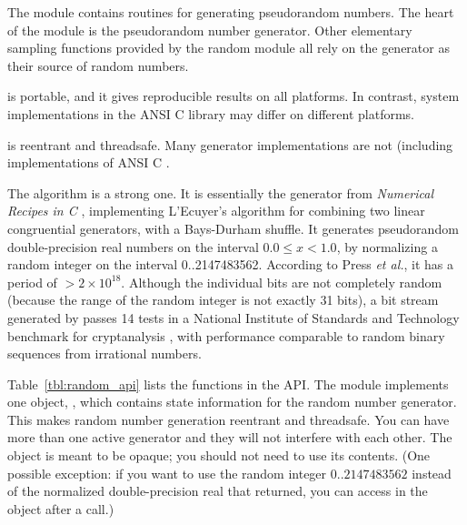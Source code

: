 The  module contains routines for generating
pseudorandom numbers. The heart of the module is the
 pseudorandom number generator. Other elementary
sampling functions provided by the random module all rely on the
 generator as their source of random numbers.

 is portable, and it gives reproducible results
on all platforms. In contrast, system  implementations
in the ANSI C library may differ on different platforms.

 is reentrant and threadsafe. Many generator
implementations are not (including implementations of ANSI C
.

The  algorithm is a strong one. It is essentially
the  generator from \emph{Numerical Recipes in C}
\citep{Press93}, implementing L'Ecuyer's algorithm for combining two
linear congruential generators, with a Bays-Durham shuffle. It
generates pseudorandom double-precision real numbers on the interval
$0.0 \leq x < 1.0$, by normalizing a random integer on the interval
0..2147483562.  According to Press \emph{et al.}, it has a period of
$> 2 \times 10^{18}$. Although the individual bits are not completely
random (because the range of the random integer is not exactly 31
bits), a bit stream generated by  passes 14 tests
in a National Institute of Standards and Technology benchmark for
cryptanalysis \citep{Rukhin01}, with performance comparable to random
binary sequences from irrational numbers.

Table~\ref{tbl:random_api} lists the functions in the 
API. The module implements one object, , which
contains state information for the random number generator.  This
makes random number generation reentrant and threadsafe. You can have
more than one active generator and they will not interfere with each
other. The object is meant to be opaque; you should not need to use
its contents.  (One possible exception: if you want to use the random
integer $0..2147483562$ instead of the normalized double-precision
real that  returned, you can access
 in the  object after a
 call.)

